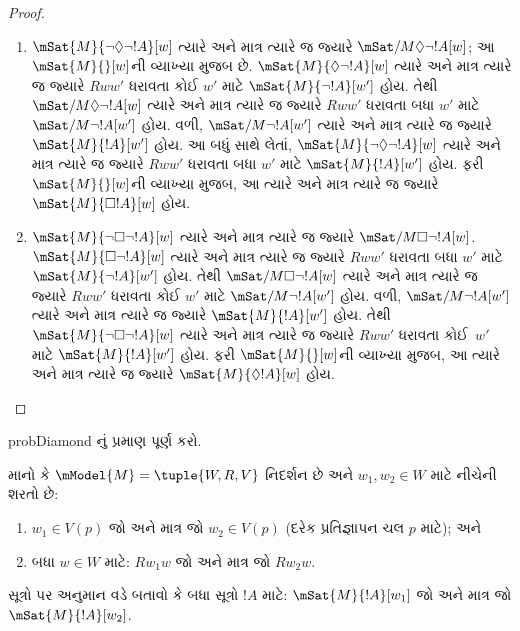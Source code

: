 \begin{proof}
  \begin{enumerate}
    \item $\mSat{M}{\lnot\Diamond\lnot !A}[w]$ ત્યારે અને માત્ર ત્યારે જ જ્યારે $\mSat/{M}{\Diamond\lnot
      !A}[w]$; આ $\mSat{M}{}[w]$ની વ્યાખ્યા મુજબ છે. $\mSat{M}{\Diamond\lnot
      !A}[w]$ ત્યારે અને માત્ર ત્યારે જ જ્યારે $Rww'$ ધરાવતા કોઈ $w'$ માટે
      $\mSat{M}{\lnot !A}[w']$ હોય. તેથી $\mSat/{M}{\Diamond\lnot !A}[w]$
      ત્યારે અને માત્ર ત્યારે જ જ્યારે $Rww'$ ધરાવતા બધા $w'$ માટે
      $\mSat/{M}{\lnot !A}[w']$ હોય. વળી, $\mSat/{M}{\lnot !A}[w']$
      ત્યારે અને માત્ર ત્યારે જ જ્યારે $\mSat{M}{!A}[w']$ હોય. આ બધું
      સાથે લેતાં, $\mSat{M}{\lnot\Diamond\lnot !A}[w]$ ત્યારે અને માત્ર
      ત્યારે જ જ્યારે $Rww'$ ધરાવતા બધા $w'$ માટે $\mSat{M}{!A}[w']$ હોય.
      ફરી $\mSat{M}{}[w]$ની વ્યાખ્યા મુજબ, આ ત્યારે અને માત્ર ત્યારે જ
      જ્યારે $\mSat{M}{\Box !A}[w]$ હોય.
    \item $\mSat{M}{\lnot\Box\lnot !A}[w]$
      ત્યારે અને માત્ર ત્યારે જ જ્યારે $\mSat/{M}{\Box\lnot !A}[w]$.
      $\mSat{M}{\Box\lnot !A}[w]$ ત્યારે અને માત્ર ત્યારે જ જ્યારે
      $Rww'$ ધરાવતા બધા $w'$ માટે $\mSat{M}{\lnot !A}[w']$ હોય. તેથી
      $\mSat/{M}{\Box\lnot !A}[w]$ ત્યારે અને માત્ર ત્યારે જ જ્યારે
      $Rww'$ ધરાવતા કોઈ $w'$ માટે $\mSat/{M}{\lnot !A}[w']$ હોય.
      વળી, $\mSat/{M}{\lnot !A}[w']$ ત્યારે અને માત્ર ત્યારે જ જ્યારે
      $\mSat{M}{!A}[w']$ હોય. તેથી $\mSat{M}{\lnot\Box\lnot !A}[w]$
      ત્યારે અને માત્ર ત્યારે જ જ્યારે $Rww'$ ધરાવતા કોઈ~$w'$ માટે
      $\mSat{M}{!A}[w']$ હોય. ફરી $\mSat{M}{}[w]$ની વ્યાખ્યા મુજબ,
      આ ત્યારે અને માત્ર ત્યારે જ જ્યારે $\mSat{M}{\Diamond
        !A}[w]$ હોય.
  \end{enumerate}
\end{proof}

\begin{probtag}{probDiamond}
  નું પ્રમાણ પૂર્ણ કરો.
\end{probtag}

\begin{prob}
  માનો કે $\mModel{M} = \tuple{W, R, V}$ નિદર્શન છે
  અને $w_1, w_2 \in W$ માટે નીચેની શરતો છે:
  \begin{enumerate}
  \item $w_1 \in V(p)$ જો અને માત્ર જો $w_2 \in V(p)$
    (દરેક પ્રતિજ્ઞાપન ચલ $p$ માટે); અને
  \item બધા $w \in W$ માટે: $Rw_1w$ જો અને માત્ર જો $Rw_2w$.
  \end{enumerate}
  સૂત્રો પર અનુમાન વડે બતાવો કે બધા સૂત્રો $!A$ માટે:
  $\mSat{M}{!A}[w_1]$ જો અને માત્ર જો $\mSat{M}{!A}[w_2]$.
\end{prob}

